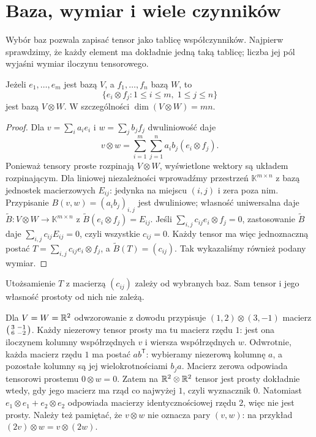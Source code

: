 \section{Baza, wymiar i wiele czynników}
\label{sec:baza-tensorowa}

Wybór baz pozwala zapisać tensor jako tablicę współczynników.
Najpierw sprawdzimy, że każdy element ma dokładnie jedną taką tablicę;
liczba jej pól wyjaśni wymiar iloczynu tensorowego.

\begin{twierdzenie}
\label{thm:baza-tensorowa}
Jeżeli $e_1,\ldots,e_m$ jest bazą $V$, a
$f_1,\ldots,f_n$ bazą $W$, to
\[
 \bigl\{e_i\otimes f_j:1\leq i\leq m,\;1\leq j\leq n\bigr\}
\]
jest bazą $V\otimes W$. W szczególności
$\dim(V\otimes W)=mn$.
\end{twierdzenie}
\begin{proof}
Dla $v=\sum_i a_i e_i$ i $w=\sum_j b_j f_j$ dwuliniowość daje
\[
 v\otimes w=\sum_{i=1}^m\sum_{j=1}^n a_ib_j(e_i\otimes f_j).
\]
Ponieważ tensory proste rozpinają $V\otimes W$, wyświetlone
wektory są układem rozpinającym. Dla liniowej niezależności
wprowadźmy przestrzeń $\mathbb K^{m\times n}$ z bazą jednostek
macierzowych $E_{ij}$: jedynka na miejscu $(i,j)$ i zera poza nim. Przypisanie
$B(v,w)=(a_i b_j)_{i,j}$ jest dwuliniowe; własność uniwersalna
daje $\widetilde B\colon V\otimes W\to\mathbb K^{m\times n}$
z $\widetilde B(e_i\otimes f_j)=E_{ij}$. Jeśli
$\sum_{i,j}c_{ij}e_i\otimes f_j=0$, zastosowanie
$\widetilde B$ daje $\sum_{i,j}c_{ij}E_{ij}=0$, czyli
wszystkie $c_{ij}=0$. Każdy tensor ma więc jednoznaczną postać
$T=\sum_{i,j}c_{ij}e_i\otimes f_j$, a $\widetilde B(T)=(c_{ij})$.
Tak wykazaliśmy również podany wymiar.
\end{proof}

Utożsamienie $T$ z macierzą $(c_{ij})$ zależy od wybranych baz.
Sam tensor i jego własność prostoty od nich nie zależą.

\begin{przyklad}
Dla $V=W=\mathbb{R}^2$ odwzorowanie z dowodu przypisuje
$(1,2)\otimes(3,-1)$ macierz
$\begin{psmallmatrix}3&-1\\6&-2\end{psmallmatrix}$.
Każdy niezerowy tensor prosty ma tu macierz rzędu $1$:
jest ona iloczynem kolumny współrzędnych $v$ i wiersza
współrzędnych $w$. Odwrotnie, każda macierz rzędu $1$
ma postać $ab^{\mathsf T}$: wybieramy niezerową kolumnę $a$,
a pozostałe kolumny są jej wielokrotnościami $b_j a$.
Macierz zerowa odpowiada tensorowi prostemu $0\otimes w=0$.
Zatem na $\mathbb{R}^2\otimes\mathbb{R}^2$ tensor jest prosty dokładnie wtedy,
gdy jego macierz ma rząd co najwyżej $1$, czyli wyznacznik $0$.
Natomiast
$e_1\otimes e_1+e_2\otimes e_2$ odpowiada macierzy
identycznościowej rzędu $2$, więc nie jest prosty.
Należy też pamiętać, że $v\otimes w$ nie oznacza pary $(v,w)$:
na przykład $(2v)\otimes w=v\otimes(2w)$.
\end{przyklad}

